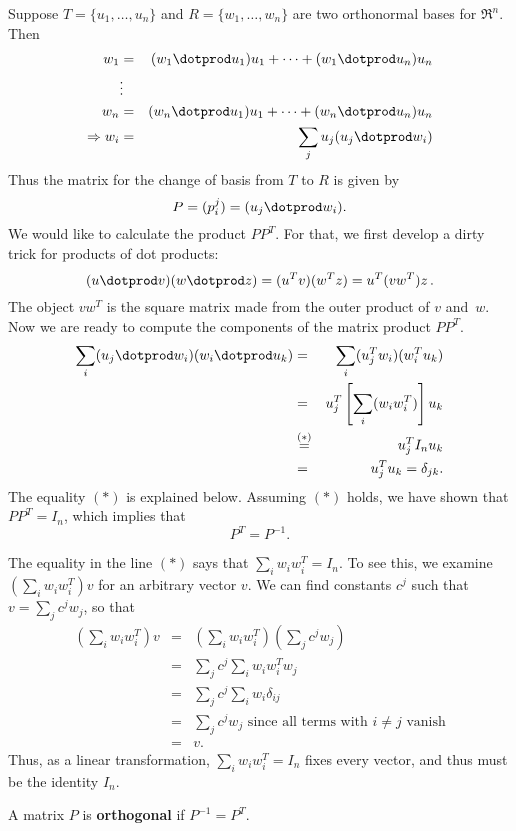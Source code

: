 Suppose $T=\{u_1, \ldots, u_n \}$ and $R=\{w_1, \ldots, w_n \}$ are two orthonormal bases for $\Re^n$.  Then\\[3mm]
\begin{eqnarray*}
w_1 &=& (w_1\dotprod u_1) u_1 + \cdots + (w_1\dotprod u_n)u_n\\
 & \vdots & \\
w_n &=& (w_n\dotprod u_1) u_1 + \cdots + (w_n\dotprod u_n)u_n\\
\Rightarrow w_i &=& \sum_j u_j(u_j\dotprod w_i) \\
\end{eqnarray*}
Thus the matrix for the change of basis from $T$ to $R$ is given by 
\[
P = (p^j_i) = (u_j\dotprod w_i).
\]
We would like to calculate the product $PP^T$. For that, we first develop a dirty trick for products of dot products:
\[
(u\dotprod v)(w\dotprod z)=(u^T v) (w^T z) = u^T (v w^T) z\, . 
\]
The object $v w^T$ is the square matrix made from the outer product of $v$ and~$w$. 
Now we are ready to compute the components of the matrix product $PP^T$.
\begin{eqnarray*}
\sum_i(u_j\dotprod w_i)(w_i\dotprod u_k)&=&
 \sum_i(u_j^T w_i) (w_i^T u_k)\\
&=& u_j^T \left[\sum_i (w_i w_i^T) \right] u_k \\
&\stackrel{(*)}=& u_j^T I_n u_k \\\
&=& u_j^T u_k = \delta_{jk}.
\end{eqnarray*}
The equality $(*)$ is explained below.  Assuming $(*)$ holds, we have shown that $PP^T=I_n$, which implies that 
\[
P^T=P^{-1}.
\]

The equality in the line $(*)$ says that $\sum_i w_i w_i^T=I_n$.  To see this, we examine $\left(\sum_i w_i w_i^T\right)v$ for an arbitrary vector $v$.  We can find constants $c^j$ such that $v=\sum_j c^jw_j$, so that
\begin{eqnarray*}
\left(\sum_i w_i w_i^T\right)v &=& \left(\sum_i w_i w_i^T\right)\left(\sum_j c^jw_j\right) \\
&=& \sum_j c^j \sum_i w_i w_i^T w_j \\
&=& \sum_j c^j \sum_i w_i \delta_{ij} \\
&=& \sum_j c^j w_j \text{ since all terms with $i\neq j$ vanish}\\
&=&v.
\end{eqnarray*}
Thus, as a linear transformation, $\sum_i w_i w_i^T=I_n$ fixes every vector, and thus must be the identity $I_n$.

\begin{definition}
A matrix $P$ is {\bf orthogonal} if $P^{-1}=P^T$.
\end{definition}

